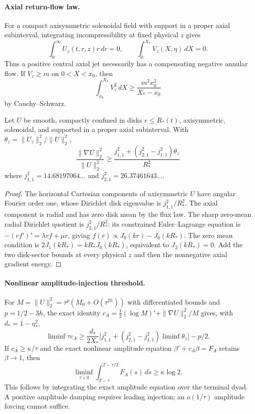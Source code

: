 \paragraph{Axial return-flow law.}
For a compact axisymmetric solenoidal field with support in a proper axial subinterval, integrating incompressibility at fixed physical $z$ gives
\[
\boxed{\int_0^\infty U_z(t,r,z)r\,dr=0},\qquad
\boxed{\int_0^{X_*}V_z(X,\eta)\,dX=0}.
\]
Thus a positive central axial jet necessarily has a compensating negative annular flow. If $V_z\ge m$ on $0<X<x_0$, then
\[
\int_{x_0}^{X_*}V_z^2\,dX\ge\frac{m^2x_0^2}{X_*-x_0}
\]
by Cauchy--Schwarz.
\begin{theorem}
Let $U$ be smooth, compactly confined in disks $r\le R_*(t)$, axisymmetric, solenoidal, and supported in a proper axial subinterval. With $\theta_z=\|U_z\|_2^2/\|U\|_2^2$,
\[
\boxed{\frac{\|\nabla U\|_2^2}{\|U\|_2^2}
\ge\frac{j_{1,1}^2+(j_{2,1}^2-j_{1,1}^2)\theta_z}{R_*^2}}
\]
where $j_{1,1}^2=14.68197064\ldots$ and $j_{2,1}^2=26.37461643\ldots$.
\end{theorem}
\begin{proof}
The horizontal Cartesian components of axisymmetric $U$ have angular Fourier order one, whose Dirichlet disk eigenvalue is $j_{1,1}^2/R_*^2$. The axial component is radial and has zero disk mean by the flux law. The sharp zero-mean radial Dirichlet quotient is $j_{2,1}^2/R_*^2$: its constrained Euler--Lagrange equation is $-(rf')'=\lambda rf+\mu r$, giving $f(r)\propto J_0(kr)-J_0(kR_*)$. The zero mean condition is $2J_1(kR_*)=kR_*J_0(kR_*)$, equivalent to $J_2(kR_*)=0$. Add the two disk-sector bounds at every physical $z$ and then the nonnegative axial gradient energy.
\end{proof}
\paragraph{Nonlinear amplitude-injection threshold.}
For $M=\|U\|_2^2=\tau^p(M_0+O(\tau^{2h}))$ with differentiated bounds and $p=1/2-3h$, the exact identity
$c_A=\frac12(\log M)'+\|\nabla U\|_2^2/M$ gives, with $d_*=1-\eta_*^2$,
\[
\liminf\tau c_A\ge\frac{d_*}{2X_*}
\bigl[j_{1,1}^2+(j_{2,1}^2-j_{1,1}^2)\liminf\theta_z\bigr]-p/2.
\]
If $c_A\ge\kappa/\tau$ and the exact nonlinear amplitude equation
$\beta'+c_A\beta=F_A$ retains $\beta\to1$, then
\[
\boxed{\liminf_{\tau\downarrow0}\int_{T-\tau}^{T-\tau/2}F_A(s)\,ds
\ge\kappa\log2}.
\]
This follows by integrating the exact amplitude equation over the terminal dyad. A positive amplitude damping requires leading injection; an $o(1/\tau)$ amplitude forcing cannot suffice.
